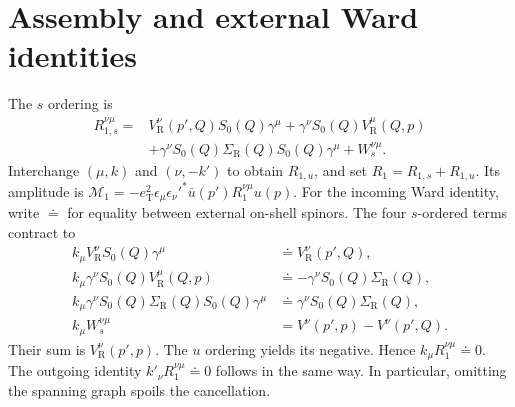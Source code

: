 \section{Assembly and external Ward identities}
The $s$ ordering is
\begin{equation}
 \begin{aligned}
 R_{1,s}^{\nu\mu}={}&V_{\mathrm R}^\nu(p',Q)S_0(Q)\gamma^\mu
 +\gamma^\nu S_0(Q)V_{\mathrm R}^\mu(Q,p)\\
 &+\gamma^\nu S_0(Q)\Sigma_{\mathrm R}(Q)S_0(Q)\gamma^\mu
 +W_s^{\nu\mu}.
 \end{aligned}
\end{equation}
Interchange $(\mu,k)$ and $(\nu,-k')$ to obtain $R_{1,u}$, and
set $R_1=R_{1,s}+R_{1,u}$. Its amplitude is
$\mathcal M_1=-e_{\mathrm T}^2\epsilon_\mu\epsilon_\nu'^*
\bar u(p')R_1^{\nu\mu}u(p)$.
For the incoming Ward identity, write $\doteq$ for equality between
external on-shell spinors. The four $s$-ordered terms contract to
\begin{align}
 k_\mu V_{\mathrm R}^\nu S_0(Q)\gamma^\mu
 &\doteq V_{\mathrm R}^\nu(p',Q),\\
 k_\mu\gamma^\nu S_0(Q)V_{\mathrm R}^\mu(Q,p)
 &\doteq-\gamma^\nu S_0(Q)\Sigma_{\mathrm R}(Q),\\
 k_\mu\gamma^\nu S_0(Q)\Sigma_{\mathrm R}(Q)S_0(Q)\gamma^\mu
 &\doteq\gamma^\nu S_0(Q)\Sigma_{\mathrm R}(Q),\\
 k_\mu W_s^{\nu\mu}&=V^\nu(p',p)-V^\nu(p',Q).
\end{align}
Their sum is $V_{\mathrm R}^\nu(p',p)$. The $u$ ordering yields
its negative. Hence $k_\mu R_1^{\nu\mu}\doteq0$. The outgoing
identity $k'_\nu R_1^{\nu\mu}\doteq0$ follows in the same way.
In particular, omitting the spanning graph spoils the cancellation.

